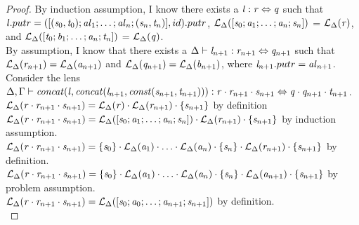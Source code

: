 \begin{lemma}
\begin{proof}
By induction assumption, I know
there exists a $\mathit{l} : \mathit{r} \Leftrightarrow \mathit{q}$ such that
$\mathit{l}.putr = ([(\mathit{s}_0,\mathit{t}_0);\mathit{al}_1 ; \ldots ; \mathit{al}_n;(\mathit{s}_n,\mathit{t}_n)],id).putr$,
$\mathcal{L}_{\Delta}([\mathit{s}_0 ; \mathit{a}_1 ; \ldots ; \mathit{a}_n ; \mathit{s}_n])$ =
$\mathcal{L}_{\Delta}(\mathit{r})$,
and $\mathcal{L}_{\Delta}([\mathit{t}_0 ; \mathit{b}_1 ; \ldots ; \mathit{a}_n ; \mathit{t}_n])$ = $\mathcal{L}_{\Delta}(\mathit{q})$.\\
By assumption, I know that there exists a $\Delta \vdash \mathit{l}_{n+1} : \mathit{r}_{n+1} \Leftrightarrow \mathit{q}_{n+1}$ such that $\mathcal{L}_{\Delta}(\mathit{r}_{n+1})=\mathcal{L}_{\Delta}(\mathit{a}_{n+1})$
and $\mathcal{L}_{\Delta}(\mathit{q}_{n+1})=\mathcal{L}_{\Delta}(\mathit{b}_{n+1})$, where $\mathit{l}_{n+1}.putr=\mathit{al}_{n+1}$.\\
Consider the lens $\Delta, \Gamma \vdash \mathit{concat}(\mathit{l},\mathit{concat}(\mathit{l}_{n+1},\mathit{const}(\mathit{s}_{n+1},\mathit{t}_{n+1}))) : \mathit{r}\cdot\mathit{r}_{n+1}\cdot\mathit{s}_{n+1} \Leftrightarrow \mathit{q}\cdot\mathit{q}_{n+1}\cdot\mathit{t}_{n+1}$.\\
$\mathcal{L}_{\Delta}(\mathit{r}\cdot\mathit{r}_{n+1}\cdot\mathit{s}_{n+1})
= \mathcal{L}_{\Delta}(\mathit{r})\cdot\mathcal{L}_{\Delta}(\mathit{r}_{n+1})\cdot\{\mathit{s}_{n+1}\}$
by definition\\
$\mathcal{L}_{\Delta}(\mathit{r}\cdot\mathit{r}_{n+1}\cdot\mathit{s}_{n+1})
= \mathcal{L}_{\Delta}([\mathit{s}_0;\mathit{a}_1; \ldots ; \mathit{a}_n;\mathit{s}_n])
\cdot\mathcal{L}_{\Delta}(\mathit{r}_{n+1})\cdot\{\mathit{s}_{n+1}\}$ by induction assumption.\\
$\mathcal{L}_{\Delta}(\mathit{r}\cdot\mathit{r}_{n+1}\cdot\mathit{s}_{n+1})
= \{\mathit{s}_0\}\cdot\mathcal{L}_{\Delta}(\mathit{a}_1)\cdot\ldots\cdot\mathcal{L}_{\Delta}(\mathit{a}_n)\cdot\{\mathit{s}_n\}
\cdot\mathcal{L}_{\Delta}(\mathit{r}_{n+1})\cdot\{\mathit{s}_{n+1}\}$ by definition.\\
$\mathcal{L}_{\Delta}(\mathit{r}\cdot\mathit{r}_{n+1}\cdot\mathit{s}_{n+1})
= \{\mathit{s}_0\}\cdot\mathcal{L}_{\Delta}(\mathit{a}_1)\cdot\ldots\cdot\mathcal{L}_{\Delta}(\mathit{a}_n)\cdot\{\mathit{s}_n\}
\cdot\mathcal{L}_{\Delta}(\mathit{a}_{n+1})\cdot\{\mathit{s}_{n+1}\}$ by problem assumption.\\
$\mathcal{L}_{\Delta}(\mathit{r}\cdot\mathit{r}_{n+1}\cdot\mathit{s}_{n+1})
= \mathcal{L}_{\Delta}([\mathit{s}_0;\mathit{a}_0;\ldots;\mathit{a}_{n+1};\mathit{s}_{n+1}])$ by definition.\\


\end{proof}
\end{lemma}
